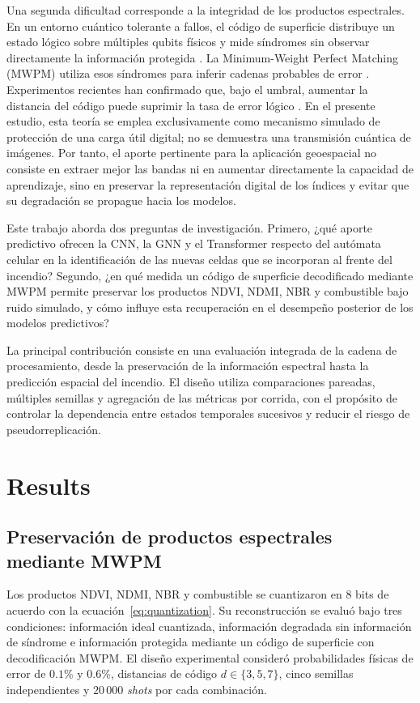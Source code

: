 \documentclass[fleqn,10pt]{wlscirep}
\begin{document}
Una segunda dificultad corresponde a la integridad de los productos espectrales. En un entorno cuántico tolerante a fallos, el código de superficie distribuye un estado lógico sobre múltiples qubits físicos y mide síndromes sin observar directamente la información protegida \cite{fowler2012,dennis2002,horsman2012}. La Minimum-Weight Perfect Matching (MWPM) utiliza esos síndromes para inferir cadenas probables de error \cite{edmonds1965,higgott2022,paler2023}. Experimentos recientes han confirmado que, bajo el umbral, aumentar la distancia del código puede suprimir la tasa de error lógico \cite{google2025}. En el presente estudio, esta teoría se emplea exclusivamente como mecanismo simulado de protección de una carga útil digital; no se demuestra una transmisión cuántica de imágenes. Por tanto, el aporte pertinente para la aplicación geoespacial no consiste en extraer mejor las bandas ni en aumentar directamente la capacidad de aprendizaje, sino en preservar la representación digital de los índices y evitar que su degradación se propague hacia los modelos.

Este trabajo aborda dos preguntas de investigación. Primero, ¿qué
aporte predictivo ofrecen la CNN, la GNN y el Transformer respecto del
autómata celular en la identificación de las nuevas celdas que se
incorporan al frente del incendio? Segundo, ¿en qué medida un código de
superficie decodificado mediante MWPM permite preservar los productos
NDVI, NDMI, NBR y combustible bajo ruido simulado, y cómo influye esta
recuperación en el desempeño posterior de los modelos predictivos?

La principal contribución consiste en una evaluación integrada de la
cadena de procesamiento, desde la preservación de la información
espectral hasta la predicción espacial del incendio. El diseño utiliza
comparaciones pareadas, múltiples semillas y agregación de las métricas
por corrida, con el propósito de controlar la dependencia entre estados
temporales sucesivos y reducir el riesgo de pseudorreplicación.

\section*{Results}

\subsection*{Preservación de productos espectrales mediante MWPM}

Los productos NDVI, NDMI, NBR y combustible se cuantizaron en 8 bits
de acuerdo con la ecuación~\ref{eq:quantization}. Su reconstrucción se
evaluó bajo tres condiciones: información ideal cuantizada, información
degradada sin información de síndrome e información protegida mediante un código
de superficie con decodificación MWPM. El diseño experimental consideró
probabilidades físicas de error de $0.1\%$ y $0.6\%$, distancias de
código $d\in\{3,5,7\}$, cinco semillas independientes y $20\,000$
\textit{shots} por cada combinación.
\end{document}
